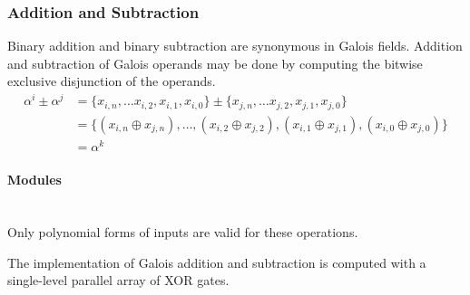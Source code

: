 \subsubsection{Addition and Subtraction} Binary addition and binary subtraction
are synonymous in Galois fields. Addition and subtraction of Galois operands
may be done by computing the bitwise exclusive disjunction of the operands.
    \begin{equation*}
        \begin{split}
            \alpha^{i} \pm \alpha^{j} & = \{ x_{i, n}, \ldots x_{i, 2},
            x_{i, 1}, x_{i, 0} \} \pm \{ x_{j, n}, \ldots x_{j, 2}, x_{j, 1},
            x_{j, 0} \} \\
            & = \{(x_{i, n} \oplus x_{j,n}), \ldots, (x_{i, 2} \oplus x_{j,
            2}), (x_{i, 1}\oplus x_{j, 1}), (x_{i, 0}\oplus x_{j, 0})\} \\
            & = \alpha^{k}
        \end{split}
    \end{equation*}

    \paragraph{{\small Modules}} \leavevmode \\ Only polynomial forms of
    inputs are valid for these operations.

    The implementation of Galois addition and subtraction is computed with a
    single-level parallel array of XOR gates.

